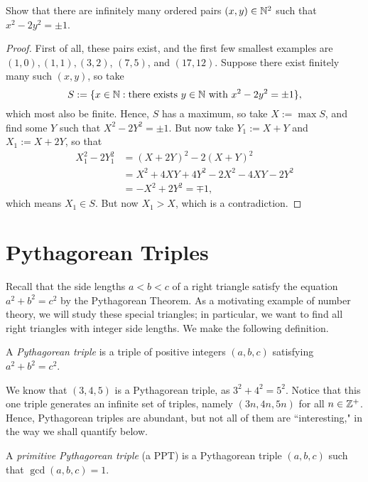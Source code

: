 \documentclass{article}
\begin{document}
\newpage
\begin{example}
Show that there are infinitely many ordered pairs $(x,y)\in \mathbb N^2$ such that $x^2 - 2y^2 = \pm 1$.
\end{example}
\begin{proof}
First of all, these pairs exist, and the first few smallest examples are $(1,0), (1,1), (3,2)$, $(7,5)$, and $(17,12)$. Suppose there exist finitely many such $(x,y)$, so take
$$S := \{x\in \mathbb N: \text{there exists } y\in\mathbb N \text{ with } x^2 - 2y^2 = \pm 1\},$$
which most also be finite. Hence, $S$ has a maximum, so take $X := \max S$, and find some $Y$ such that $X^2 - 2Y^2 = \pm 1$. But now take $Y_1 := X+Y$ and $X_1 := X + 2Y$, so that
\begin{align*}
    X_1^2 - 2Y_1^2 &= (X + 2Y)^2 - 2(X + Y)^2 \\
    &= X^2 + 4XY + 4Y^2 - 2X^2 - 4XY - 2Y^2 \\
    &= -X^2 + 2Y^2 = \mp 1,
\end{align*}
which means $X_1\in S$. But now $X_1 > X$, which is a contradiction.
\end{proof}

\section{Pythagorean Triples}
Recall that the side lengths $a<b<c$ of a right triangle satisfy the equation $a^2 + b^2 = c^2$ by the Pythagorean Theorem. As a motivating example of number theory, we will study these special triangles; in particular, we want to find all right triangles with integer side lengths. We make the following definition.
\begin{definition}
A \textit{Pythagorean triple} is a triple of positive integers $(a,b,c)$ satisfying $a^2 + b^2 = c^2$.
\end{definition}
\begin{example}
We know that $(3,4,5)$ is a Pythagorean triple, as $3^2 + 4^2 = 5^2$. Notice that this one triple generates an infinite set of triples, namely $(3n, 4n, 5n)$ for all $n\in\mathbb Z^+$. Hence, Pythagorean triples are abundant, but not all of them are ``interesting," in the way we shall quantify below.
\end{example}

\begin{definition}
A \textit{primitive Pythagorean triple} (a PPT) is a Pythagorean triple $(a,b,c)$ such that $\gcd(a,b,c) = 1$. 
\end{definition}
\end{document}
